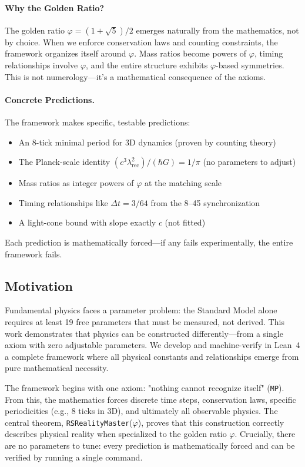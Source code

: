 \documentclass[11pt,a4paper,twoside]{article}
\numberwithin{equation}{section}
\theoremstyle{customthm}
\theoremstyle{customdef}
\theoremstyle{customrem}
\begin{document}
\paragraph{Why the Golden Ratio?} The golden ratio $\varphi = (1+\sqrt{5})/2$ emerges naturally from the mathematics, not by choice. When we enforce conservation laws and counting constraints, the framework organizes itself around $\varphi$. Mass ratios become powers of $\varphi$, timing relationships involve $\varphi$, and the entire structure exhibits $\varphi$-based symmetries. This is not numerology—it's a mathematical consequence of the axioms.

\paragraph{Concrete Predictions.} The framework makes specific, testable predictions:
\begin{itemize}[leftmargin=*,topsep=2pt,itemsep=2pt]
\item An 8-tick minimal period for 3D dynamics (proven by counting theory)
\item The Planck-scale identity $(c^3\lambda_{\mathrm{rec}}^2)/(\hbar G) = 1/\pi$ (no parameters to adjust)
\item Mass ratios as integer powers of $\varphi$ at the matching scale
\item Timing relationships like $\Delta t = 3/64$ from the 8--45 synchronization
\item A light-cone bound with slope exactly $c$ (not fitted)
\end{itemize}
Each prediction is mathematically forced—if any fails experimentally, the entire framework fails.

\subsection{Motivation}

Fundamental physics faces a parameter problem: the Standard Model alone requires at least 19 free parameters that must be measured, not derived. This work demonstrates that physics can be constructed differently—from a single axiom with zero adjustable parameters. We develop and machine-verify in Lean~4 a complete framework where all physical constants and relationships emerge from pure mathematical necessity.

The framework begins with one axiom: "nothing cannot recognize itself" (\texttt{MP}). From this, the mathematics forces discrete time steps, conservation laws, specific periodicities (e.g., 8 ticks in 3D), and ultimately all observable physics. The central theorem, \texttt{RSRealityMaster}($\varphi$), proves that this construction correctly describes physical reality when specialized to the golden ratio $\varphi$. Crucially, there are no parameters to tune: every prediction is mathematically forced and can be verified by running a single command.
\end{document}
